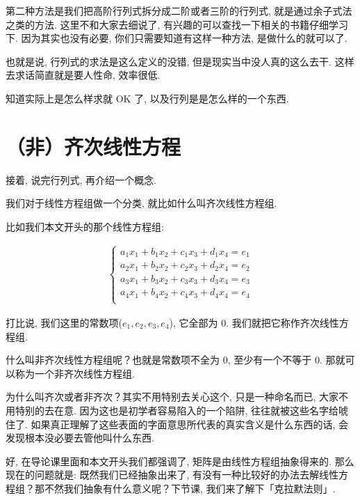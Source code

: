 第二种方法是我们把高阶行列式拆分成二阶或者三阶的行列式, 就是通过余子式法之类的方法. 这里不和大家去细说了, 有兴趣的可以查找一下相关的书籍仔细学习下. 因为其实也没有必要, 你们只需要知道有这样一种方法, 是做什么的就可以了. 

也就是说, 行列式的求法是这么定义的没错, 但是现实当中没人真的这么去干. 这样去求话简直就是要人性命, 效率很低. 

知道实际上是怎么样求就 OK 了, 以及行列是是怎么样的一个东西. 

\section{（非）齐次线性方程}

接着, 说完行列式, 再介绍一个概念. 

我们对于线性方程组做一个分类, 就比如什么叫齐次线性方程组. 

比如我们本文开头的那个线性方程组: 

\begin{align*}
\begin{cases}
  a_1x_1 + b_1x_2+ c_1x_3 + d_1x_4 = e_1 \\
  a_2x_1 + b_2x_2+ c_2x_3 + d_2x_4 = e_2 \\
  a_3x_1 + b_3x_2+ c_3x_3 + d_3x_4 = e_3 \\
  a_4x_1 + b_4x_2+ c_4x_3 + d_4x_4 = e_4 \\
\end{cases}
\end{align*}

打比说, 我们这里的常数项($e_1, e_2, e_3, e_4$),  它全部为 0. 我们就把它称作齐次线性方程组. 

什么叫非齐次线性方程组呢？也就是常数项不全为 0, 至少有一个不等于 0. 那就可以称为一个非齐次线性方程组. 

为什么叫齐次或者非齐次？其实不用特别去关心这个, 只是一种命名而已, 大家不用特别的去在意. 因为这也是初学者容易陷入的一个陷阱, 往往就被这些名字给唬住了. 如果真正理解了这些表面的字面意思所代表的真实含义是什么东西的话, 会发现根本没必要去管他叫什么东西. 

好, 在导论课里面和本文开头我们都强调了, 矩阵是由线性方程组抽象得来的. 那么现在的问题就是: 既然我们已经抽象出来了, 有没有一种比较好的办法去解线性方程组？那不然我们抽象有什么意义呢？下节课, 我们来了解下「克拉默法则」. 